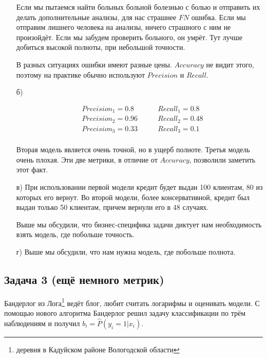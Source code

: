 \documentclass[12pt, a4paper, oneside]{article}
\begin{document}
\begin{enumerate}
		Если мы пытаемся найти больных больной болезнью с болью и отправить их делать дополнительные анализы, для нас страшнее $FN$ ошибка. Если мы отправим лишнего человека на анализы, ничего страшного с ним не произойдёт. Если мы забудем проверить больного, он умрёт. Тут лучше добиться высокой полноты, при небольшой точности. 
		
		В разных ситуациях ошибки имеют разные цены. $Accuracy$ не видит этого, поэтому на практике обычно используют $Precision$ и $Recall$. 
		
		\item[б)]  
		
		\begin{equation} 
		\begin{aligned}
		&Precision_1 =  0.8   \qquad &Recall_1 = 0.8 \\ 
		&Precision_2 = 0.96  \qquad &Recall_2 = 0.48 \\ 
		&Precision_3 = 0.33  \qquad &Recall_3 = 0.1  \\
		\end{aligned}
		\end{equation} 
		
		Вторая модель является очень точной, но в ущерб полноте. Третья модель очень плохая. Эти две метрики, в отличие от $Accuracy$, позволили заметить этот факт. 
		
		\item[в)] При использовании первой модели кредит будет выдан 100 клиентам, 80 из которых его вернут. Во второй модели, более консервативной, кредит был выдан только 50 клиентам, причем вернули его в 48 случаях. 
		
		Выше мы обсудили, что бизнес-специфика задачи диктует нам необходимость взять модель, где побольше точность.
		
		\item[г)]  Выше мы обсудили, что нам нужна модель, где побольше полнота.
	\end{enumerate}



\subsection*{Задача 3 (ещё немного метрик)}

Бандерлог из Лога\footnote{деревня в Кадуйском районе Вологодской области} ведёт блог, любит считать логарифмы и оценивать модели. С помощью нового алгоритма Бандерлог решил задачу классификации по трём наблюдениям и получил $b_i = \hat P(y_i = 1|x_i)$.
\end{document}
